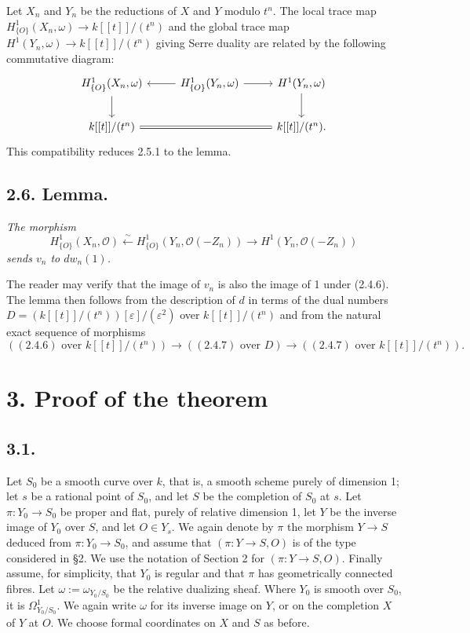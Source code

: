 \documentclass[11pt,leqno]{article}
\newcommand{\OO}{\mathcal O}
\begin{document}
Let $X_n$ and $Y_n$ be the reductions of $X$ and $Y$ modulo $t^n$. The local trace map $H^1_{\{O\}}(X_n,\omega)\to k[[t]]/(t^n)$ and the global trace map $H^1(Y_n,\omega)\to k[[t]]/(t^n)$ giving Serre duality are related by the following commutative diagram:
\[
\begin{tikzcd}[column sep=2.6em,row sep=2em]
H^1_{\{O\}}(X_n,\omega) \arrow[d] & H^1_{\{O\}}(Y_n,\omega) \arrow[l] \arrow[r] & H^1(Y_n,\omega) \arrow[d] \\
k[[t]]/(t^n) \arrow[rr,equal] & & k[[t]]/(t^n).
\end{tikzcd}
\]
This compatibility reduces 2.5.1 to the lemma.

\subsection*{2.6. Lemma.}
\emph{The morphism}
\[
        H^1_{\{O\}}(X_n,\OO)\xleftarrow{\sim} H^1_{\{O\}}(Y_n,\OO(-Z_n))\longrightarrow H^1(Y_n,\OO(-Z_n))
\]
\emph{sends $v_n$ to $dw_n(1)$.}

The reader may verify that the image of $v_n$ is also the image of 1 under (2.4.6). The lemma then follows from the description of $d$ in terms of the dual numbers $D=(k[[t]]/(t^n))[\varepsilon]/(\varepsilon^2)$ over $k[[t]]/(t^n)$ and from the natural exact sequence of morphisms
\[
        ((2.4.6)\text{ over }k[[t]]/(t^n))\longrightarrow((2.4.7)\text{ over }D)
        \longrightarrow((2.4.7)\text{ over }k[[t]]/(t^n)).
\]

\section*{3. Proof of the theorem}

\subsection*{3.1.}
Let $S_0$ be a smooth curve over $k$, that is, a smooth scheme purely of dimension 1; let $s$ be a rational point of $S_0$, and let $S$ be the completion of $S_0$ at $s$. Let $\pi:Y_0\to S_0$ be proper and flat, purely of relative dimension 1, let $Y$ be the inverse image of $Y_0$ over $S$, and let $O\in Y_s$. We again denote by $\pi$ the morphism $Y\to S$ deduced from $\pi:Y_0\to S_0$, and assume that $(\pi:Y\to S,O)$ is of the type considered in §2. We use the notation of Section 2 for $(\pi:Y\to S,O)$.
\clearpage
Finally assume, for simplicity, that $Y_0$ is regular and that $\pi$ has geometrically connected fibres. Let $\omega:=\omega_{Y_0/S_0}$ be the relative dualizing sheaf. Where $Y_0$ is smooth over $S_0$, it is $\Omega^1_{Y_0/S_0}$. We again write $\omega$ for its inverse image on $Y$, or on the completion $X$ of $Y$ at $O$. We choose formal coordinates on $X$ and $S$ as before.
\end{document}
